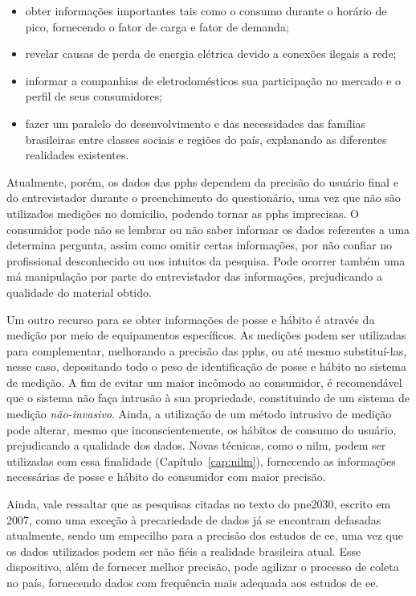 \begin{itemize}
\item obter informações importantes tais como o consumo durante o
horário de pico, fornecendo o fator de carga e fator de demanda;
\item revelar causas de perda de energia elétrica devido a conexões
ilegais a rede;
\item informar a companhias de eletrodomésticos sua participação no
mercado e o perfil de seus consumidores;
\item fazer um paralelo do desenvolvimento e das necessidades das famílias 
brasileiras entre classes sociais e regiões do país, explanando as 
diferentes realidades existentes.
\end{itemize}

Atualmente, porém, os dados das \glspl{pph} dependem da precisão do
usuário final e do entrevistador durante o preenchimento do
questionário, uma vez que não são utilizados medições no domicilio,
podendo tornar as \glspl{pph} imprecisas. O consumidor pode não se
lembrar ou não saber informar os dados referentes a uma determina
pergunta, assim como omitir certas informações, por não confiar no
profissional desconhecido ou nos intuitos da pesquisa.  Pode ocorrer
também uma má manipulação por parte do entrevistador das informações,
prejudicando a qualidade do material obtido.

Um outro recurso para se obter informações de posse e hábito é através
da medição por meio de equipamentos específicos. As medições podem ser
utilizadas para complementar, melhorando a precisão das \glspl{pph},
ou até mesmo substituí-las, nesse caso, depositando todo o peso de
identificação de posse e hábito no sistema de medição. A fim de evitar
um maior incômodo ao consumidor, é recomendável que o sistema não faça
intrusão à sua propriedade, constituindo de um sistema de medição
\emph{não-invasivo}. Ainda, a utilização de um método intrusivo de
medição pode alterar, mesmo que inconscientemente, os hábitos de
consumo do usuário, prejudicando a qualidade dos dados.  Novas
técnicas, como o \gls{nilm}, podem ser utilizadas com essa
finalidade (Capítulo~\ref{cap:nilm}), fornecendo as informações
necessárias de posse e hábito do consumidor com maior precisão. 

Ainda, vale ressaltar que as pesquisas citadas no texto do
\gls{pne2030}, escrito em 2007, como uma exceção à precariedade de
dados já se encontram defasadas atualmente, sendo um empecilho para a 
precisão dos estudos de \gls{ee}, uma vez que os dados utilizados
podem ser não fiéis a realidade brasileira atual.  Esse dispositivo,
além de fornecer melhor precisão, pode agilizar o processo de coleta 
no país, fornecendo dados com frequência mais adequada aos estudos de
\gls{ee}. 
